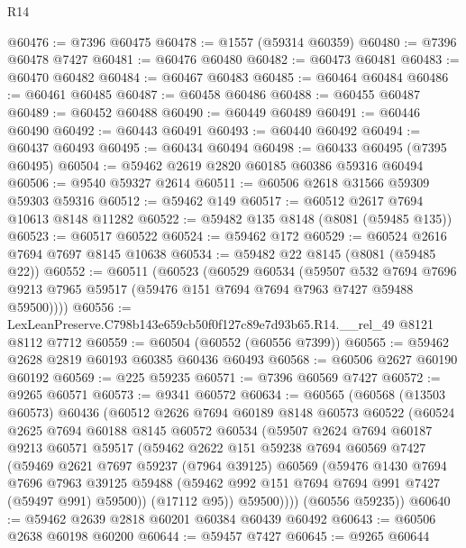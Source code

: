 \begin{lexlean}{R14}
\begin{coremodule}
@60476 := @7396 @60475
@60478 := @1557 (@59314 @60359)
@60480 := @7396 @60478 @7427
@60481 := @60476 @60480
@60482 := @60473 @60481
@60483 := @60470 @60482
@60484 := @60467 @60483
@60485 := @60464 @60484
@60486 := @60461 @60485
@60487 := @60458 @60486
@60488 := @60455 @60487
@60489 := @60452 @60488
@60490 := @60449 @60489
@60491 := @60446 @60490
@60492 := @60443 @60491
@60493 := @60440 @60492
@60494 := @60437 @60493
@60495 := @60434 @60494
@60498 := @60433 @60495 (@7395 @60495)
@60504 := @59462 @2619 @2820 @60185 @60386 @59316 @60494
@60506 := @9540 @59327 @2614
@60511 := @60506 @2618 @31566 @59309 @59303 @59316
@60512 := @59462 @149
@60517 := @60512 @2617 @7694 @10613 @8148 @11282
@60522 := @59482 @135 @8148 (@8081 (@59485 @135))
@60523 := @60517 @60522
@60524 := @59462 @172
@60529 := @60524 @2616 @7694 @7697 @8145 @10638
@60534 := @59482 @22 @8145 (@8081 (@59485 @22))
@60552 := @60511
    (@60523
      (@60529
        @60534
        (@59507
          @532
          @7694
          @7696
          @9213
          @7965
          @59517
          (@59476 @151 @7694 @7694 @7963 @7427 @59488 @59500))))
@60556 := LexLeanPreserve.C798b143e659cb50f0f127c89e7d93b65.R14.__rel_49 @8121 @8112 @7712
@60559 := @60504 (@60552 (@60556 @7399))
@60565 := @59462 @2628 @2819 @60193 @60385 @60436 @60493
@60568 := @60506 @2627 @60190 @60192
@60569 := @225 @59235
@60571 := @7396 @60569 @7427
@60572 := @9265 @60571
@60573 := @9341 @60572
@60634 := @60565
    (@60568
      (@13503 @60573)
      @60436
      (@60512
        @2626
        @7694
        @60189
        @8148
        @60573
        @60522
        (@60524
          @2625
          @7694
          @60188
          @8145
          @60572
          @60534
          (@59507
            @2624
            @7694
            @60187
            @9213
            @60571
            @59517
            (@59462
              @2622
              @151
              @59238
              @7694
              @60569
              @7427
              (@59469
                @2621
                @7697
                @59237
                (@7964 @39125)
                @60569
                (@59476
                  @1430
                  @7694
                  @7696
                  @7963
                  @39125
                  @59488
                  (@59462 @992 @151 @7694 @7694 @991 @7427 (@59497 @991) @59500))
                (@17112 @95))
              @59500))))
      (@60556 @59235))
@60640 := @59462 @2639 @2818 @60201 @60384 @60439 @60492
@60643 := @60506 @2638 @60198 @60200
@60644 := @59457 @7427
@60645 := @9265 @60644

\end{coremodule}
\end{lexlean}
